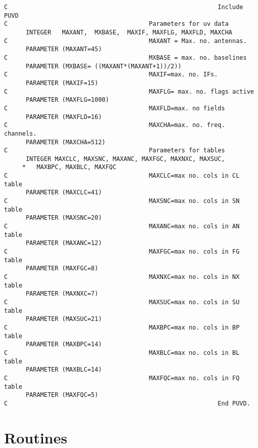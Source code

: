 \begin{verbatim}
C                                                          Include PUVD
C                                       Parameters for uv data
      INTEGER   MAXANT,  MXBASE,  MAXIF, MAXFLG, MAXFLD, MAXCHA
C                                       MAXANT = Max. no. antennas.
      PARAMETER (MAXANT=45)
C                                       MXBASE = max. no. baselines
      PARAMETER (MXBASE= ((MAXANT*(MAXANT+1))/2))
C                                       MAXIF=max. no. IFs.
      PARAMETER (MAXIF=15)
C                                       MAXFLG= max. no. flags active
      PARAMETER (MAXFLG=1000)
C                                       MAXFLD=max. no fields
      PARAMETER (MAXFLD=16)
C                                       MAXCHA=max. no. freq. channels.
      PARAMETER (MAXCHA=512)
C                                       Parameters for tables
      INTEGER MAXCLC, MAXSNC, MAXANC, MAXFGC, MAXNXC, MAXSUC,
     *   MAXBPC, MAXBLC, MAXFQC
C                                       MAXCLC=max no. cols in CL table
      PARAMETER (MAXCLC=41)
C                                       MAXSNC=max no. cols in SN table
      PARAMETER (MAXSNC=20)
C                                       MAXANC=max no. cols in AN table
      PARAMETER (MAXANC=12)
C                                       MAXFGC=max no. cols in FG table
      PARAMETER (MAXFGC=8)
C                                       MAXNXC=max no. cols in NX table
      PARAMETER (MAXNXC=7)
C                                       MAXSUC=max no. cols in SU table
      PARAMETER (MAXSUC=21)
C                                       MAXBPC=max no. cols in BP table
      PARAMETER (MAXBPC=14)
C                                       MAXBLC=max no. cols in BL table
      PARAMETER (MAXBLC=14)
C                                       MAXFQC=max no. cols in FQ table
      PARAMETER (MAXFQC=5)
C                                                          End PUVD.

\end{verbatim}
\section{Routines}

